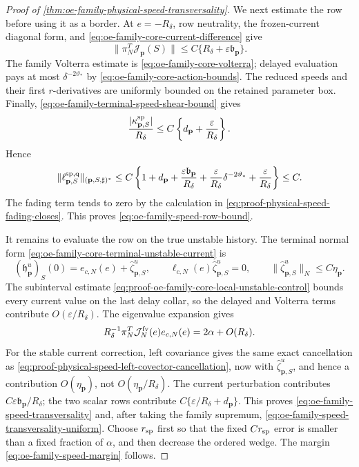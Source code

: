 \begin{proof}[Proof of
\cref{thm:oe-family-physical-speed-transversality}]
We next estimate the row before using it as a border.  At
\(e=-R_\delta\), row neutrality, the frozen-current diagonal form, and
\cref{eq:oe-family-core-current-difference} give
\[
 \|\pi_N^T\mathcal J_{\mathbf p}(S)\|
 \le C\{R_\delta+\varepsilon\mathfrak b_{\mathbf p}\}.
\]
The family Volterra estimate is
\cref{eq:oe-family-core-volterra}; delayed evaluation pays at most
\(\delta^{-2\vartheta_*}\) by
\cref{eq:oe-family-core-action-bounds}.  The reduced speeds and their
first \(r\)-derivatives are uniformly bounded on the retained parameter
box.  Finally,
\cref{eq:oe-family-terminal-speed-shear-bound} gives
\[
 \frac{|\kappa_{\mathbf p,S}^{\rm sp}|}{R_\delta}
 \le C\left\{d_{\mathbf p}+\frac{\varepsilon}{R_\delta}\right\}.
\]
Hence
\begin{equation}
 \|\ell_{\mathbf p,S}^{\rm sp,q}\|_
       {(\mathbf p,S,\sharp)^*}
 \le C\left\{1+d_{\mathbf p}
 +\frac{\varepsilon\mathfrak b_{\mathbf p}}{R_\delta}
 +\frac{\varepsilon}{R_\delta}\delta^{-2\vartheta_*}
 +\frac{\varepsilon}{R_\delta}\right\}\le C.   \label{eq:proof-oe-family-speed-row-bound}
\end{equation}
The fading term tends to zero by the calculation in
\cref{eq:proof-physical-speed-fading-closes}.  This proves
\cref{eq:oe-family-speed-row-bound}.

It remains to evaluate the row on the true unstable history.  The terminal
normal form \cref{eq:oe-family-core-terminal-unstable-current} is
\[
 (\mathfrak h_{\mathbf p}^u)_S(0)
 =e_{c,N}(e)+\widehat\zeta_{\mathbf p,S}^u,\qquad
 \ell_{c,N}(e)\widehat\zeta_{\mathbf p,S}^u=0,\qquad
 \|\widehat\zeta_{\mathbf p,S}^u\|_N\le C\eta_{\mathbf p}.
\]
The subinterval estimate
\cref{eq:proof-oe-family-core-local-unstable-control} bounds every
current value on the last delay collar, so the delayed and Volterra terms
contribute \(O(\varepsilon/R_\delta)\).  The eigenvalue expansion gives
\[
 R_\delta^{-1}\pi_N^T
 \mathcal J_N^{\rm fv}(e)e_{c,N}(e)
 =2\alpha+O(R_\delta).
\]
For the stable current correction, left covariance gives the same exact
cancellation as
\cref{eq:proof-physical-speed-left-covector-cancellation}, now with
\(\widehat\zeta_{\mathbf p,S}^u\), and hence a contribution
\(O(\eta_{\mathbf p})\), not \(O(\eta_{\mathbf p}/R_\delta)\).
The current perturbation contributes
\(C\varepsilon\mathfrak b_{\mathbf p}/R_\delta\); the two scalar rows
contribute \(C\{\varepsilon/R_\delta+d_{\mathbf p}\}\).  This proves
\cref{eq:oe-family-speed-transversality} and, after taking the family
supremum, \cref{eq:oe-family-speed-transversality-uniform}.
Choose \(r_{\rm sp}\) first so that the fixed \(Cr_{\rm sp}\) error is
smaller than a fixed fraction of \(\alpha\), and then decrease the ordered
wedge.  The margin \cref{eq:oe-family-speed-margin} follows.


\end{proof}
